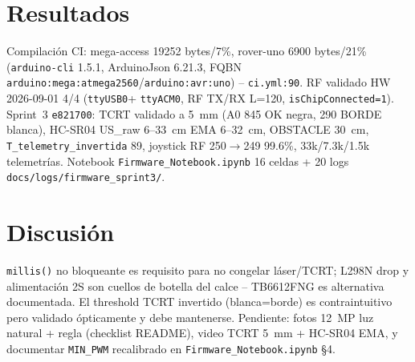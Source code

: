 \documentclass[conference]{IEEEtran}
\begin{document}
\begin{table}[t]
\centering
\caption{Calce Rover (fuente hardware-inventory.md \S Calce)}
\label{tab:calce}
\footnotesize
\setlength{\tabcolsep}{3pt}
\end{table}

\section{Resultados}
Compilación CI: mega-access 19252 bytes/7\%, rover-uno 6900 bytes/21\% (\texttt{arduino-cli} 1.5.1, ArduinoJson 6.21.3, FQBN \texttt{arduino:mega:atmega2560}/\texttt{arduino:avr:uno}) -- \texttt{ci.yml:90}. RF validado HW 2026-09-01 4/4 (\texttt{ttyUSB0}+ \texttt{ttyACM0}, RF TX/RX L=120, \texttt{isChipConnected=1}). Sprint~3 \texttt{e821700}: TCRT validado a 5~mm (A0 845 OK negra, 290 BORDE blanca), HC-SR04 US\_raw 6--33~cm EMA 6--32~cm, OBSTACLE 30~cm, \texttt{T\_telemetry\_invertida} 89, joystick RF 250$\rightarrow$249 99.6\%, 33k/7.3k/1.5k telemetrías. Notebook \texttt{Firmware\_Notebook.ipynb} 16 celdas + 20 logs \texttt{docs/logs/firmware\_sprint3/}.

\section{Discusión}
\texttt{millis()} no bloqueante es requisito para no congelar láser/TCRT; L298N drop y alimentación 2S son cuellos de botella del calce -- TB6612FNG es alternativa documentada. El threshold TCRT invertido (blanca=borde) es contraintuitivo pero validado ópticamente y debe mantenerse. Pendiente: fotos 12~MP luz natural + regla (checklist README), video TCRT 5~mm + HC-SR04 EMA, y documentar \texttt{MIN\_PWM} recalibrado en \texttt{Firmware\_Notebook.ipynb} \S4.
\end{document}
